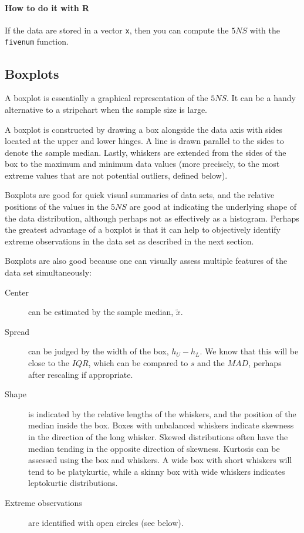 \documentclass[captions=tableheading]{scrbook}
\begin{document}
\paragraph*{How to do it with \textsf{R}}

If the data are stored in a vector \texttt{x}, then you can compute the \(5NS\) with the \texttt{fivenum} function.
\subsection{Boxplots}
\label{sec-2-4-3}

\label{sub:boxplots}

A boxplot is essentially a graphical representation of the \(5NS\). It can be a handy alternative to a stripchart when the sample size is large.

A boxplot is constructed by drawing a box alongside the data axis with sides located at the upper and lower hinges. A line is drawn parallel to the sides to denote the sample median. Lastly, whiskers are extended from the sides of the box to the maximum and minimum data values (more precisely, to the most extreme values that are not potential outliers, defined below).

Boxplots are good for quick visual summaries of data sets, and the relative positions of the values in the \(5NS\) are good at indicating the underlying shape of the data distribution, although perhaps not as effectively as a histogram. Perhaps the greatest advantage of a boxplot is that it can help to objectively identify extreme observations in the data set as described in the next section.

Boxplots are also good because one can visually assess multiple features of the data set simultaneously:

\begin{description}
\item[Center] can be estimated by the sample median, \(\tilde{x}\).
\item[Spread] can be judged by the width of the box, \(h_{U}-h_{L}\). We know that this will be close to the \(IQR\), which can be compared to \(s\) and the \(MAD\), perhaps after rescaling if appropriate.
\item[Shape] is indicated by the relative lengths of the whiskers, and the position of the median inside the box. Boxes with unbalanced whiskers indicate skewness in the direction of the long whisker. Skewed distributions often have the median tending in the opposite direction of skewness. Kurtosis can be assessed using the box and whiskers. A wide box with short whiskers will tend to be platykurtic, while a skinny box with wide whiskers indicates leptokurtic distributions.
\item[Extreme observations] are identified with open circles (see below).
\end{description}
\end{document}
